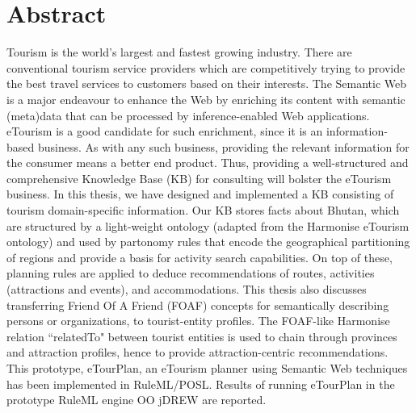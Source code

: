 \chapter*{Abstract}
 \doublespacing 

Tourism is the world's largest and fastest growing industry. There are conventional tourism service providers which are competitively trying to provide the best travel services to customers based on their interests. The Semantic Web is a major endeavour to enhance the Web by enriching its content with semantic (meta)data that can be processed by inference-enabled Web applications. eTourism is a good candidate for such enrichment, since it is an information-based business. As with any such business, providing the relevant information for the consumer means a better end product. Thus, providing a well-structured and comprehensive Knowledge Base (KB) for consulting will bolster the eTourism business.
In this thesis, we have designed and implemented a KB consisting of tourism domain-specific information. Our KB stores facts about Bhutan, which are structured by a light-weight ontology (adapted from the Harmonise eTourism ontology) and used by partonomy rules that encode the geographical partitioning of regions and provide a basis for activity search capabilities. On top of these, planning rules are applied to deduce recommendations of routes, activities (attractions and events), and accommodations. This thesis also discusses transferring Friend Of A Friend (FOAF) concepts for semantically describing persons or organizations, to tourist-entity profiles. The FOAF-like Harmonise relation ``relatedTo" between tourist entities is used to chain through provinces and attraction profiles, hence to provide attraction-centric recommendations. This prototype, eTourPlan, an eTourism planner using Semantic Web techniques has been implemented in RuleML/POSL. Results of running eTourPlan in the prototype RuleML engine OO jDREW are reported.


